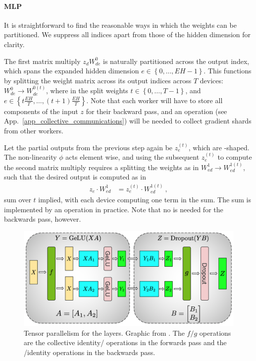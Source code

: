 \documentclass[11pt]{article}
\begin{document}
\paragraph{MLP}
It is straightforward to find the reasonable ways in which the weights can be partitioned. We
suppress all indices apart from those of the hidden dimension for clarity.

The first matrix multiply $ z _{ d }W ^{ 0 } _{ d e } $ is naturally partitioned across the output
index, which spans the expanded hidden dimension $ e\in \left \{ 0, \ldots , EH-1 \right \} $. This
functions by splitting the weight matrix across its output indices across $ T $ devices:  $ W ^{ 0 }
_{ d e } \longrightarrow W ^{ 0(t) } _{ d e }$, where in the split weights $ t\in \left \{ 0,
    \ldots , T-1  \right \} $, and $ e \in \left \{ t\frac{  EH}{ T } ,
\ldots ,\left ( t+1 \right ) \frac{ EH }{ T } \right \} $. Note that each worker will have to store
all components of the input $ z $ for their backward pass, and an  operation
(see App.~\ref{app_collective_communications}) will be needed to collect gradient shards from other
workers.


Let the partial outputs from the previous step again be $ z _{ e } ^{ (t) } $, which are
-shaped. The non-linearity $ \phi $ acts element wise, and using the subsequent
$ z _{ e } ^{ (t) }  $ to compute the second matrix multiply requires a splitting the weights as in $ W ^{ 1 }
_{ e d } \longrightarrow W ^{ 1(t) } _{  e d}$, such that the desired output is computed as in
\begin{align}
     z _{ e }\cdot W ^{ 1 }_{ ed }&=z _{ e }^{ (t) }\cdot W ^{ 1(t) }_{ ed } \ ,
\end{align}
sum over $ t $ implied, with each device computing one term in the sum.  The sum is implemented by
an  operation in practice. Note that no  is needed for the
backwards pass, however.



\begin{figure}[ht]
 \centering
 \includegraphics[scale=.3]{figures/mlp_mp_2.png}
 \caption{Tensor parallelism for the  layers. Graphic from
 \cite{shoeybi2020megatronlm}. The $ f/g $ operations are the collective
identity/ operations in the forwards pass and the /identity
operations in the backwards pass.}
 \label{fig_mlp_tensor_parallel}
\end{figure}
\end{document}
